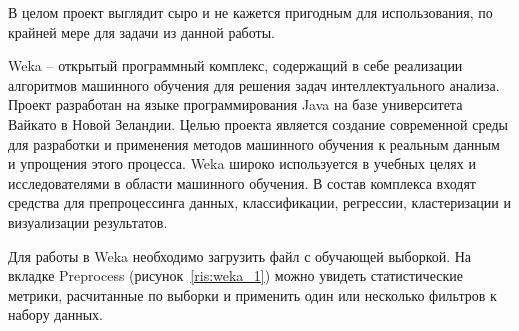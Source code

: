 



В целом проект выглядит сыро и не кажется пригодным для использования, по крайней мере для задачи из данной работы.


Weka -- открытый программный комплекс, содержащий в себе реализации алгоритмов машинного обучения для решения задач интеллектуального анализа. Проект разработан на языке программирования Java на базе университета Вайкато в Новой Зеландии. Целью проекта является создание современной среды для разработки и применения методов машинного обучения к реальным данным и упрощения этого процесса. Weka широко используется в учебных целях и исследователями в области машинного обучения. В состав комплекса входят средства для препроцессинга данных, классификации, регрессии, кластеризации и визуализации результатов\cite{weka1}.


Для работы в Weka необходимо загрузить файл с обучающей выборкой. На вкладке Preprocess (рисунок~\ref{ris:weka_1}) можно увидеть статистические метрики, расчитанные по выборки и применить один или несколько фильтров к набору данных.
